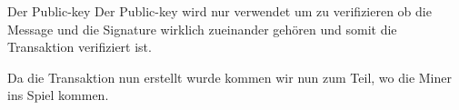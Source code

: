 \noindent
Der Public-key
Der Public-key wird nur verwendet um zu verifizieren ob die Message und die Signature wirklich zueinander gehören und somit die Transaktion verifiziert ist.

\noindent
Da die Transaktion nun erstellt wurde kommen wir nun zum Teil, wo die Miner ins Spiel kommen.





\newpage
